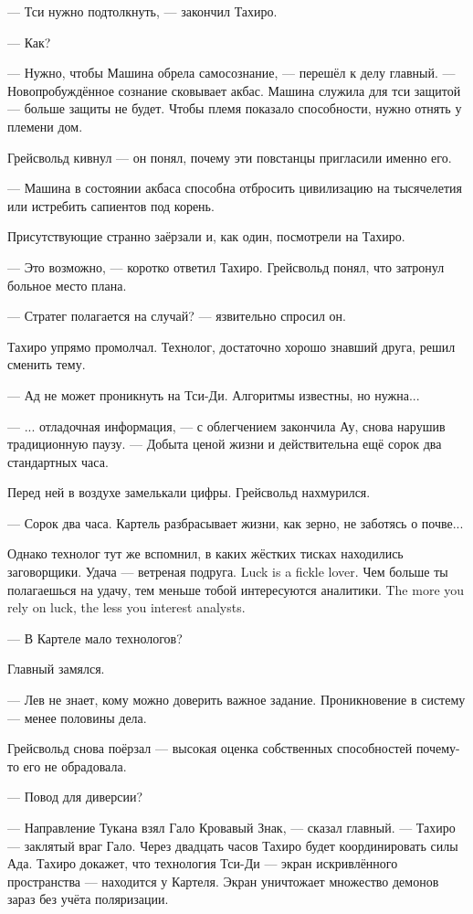 --- Тси нужно подтолкнуть, --- закончил Тахиро.

--- Как?

--- Нужно, чтобы Машина обрела самосознание, --- перешёл к делу главный.
--- Новопробуждённое сознание сковывает акбас.
Машина служила для тси защитой --- больше защиты не будет.
Чтобы племя показало способности, нужно отнять у племени дом.

Грейсвольд кивнул --- он понял, почему эти повстанцы пригласили именно его.

--- Машина в состоянии акбаса способна отбросить цивилизацию на тысячелетия или истребить сапиентов под корень.

Присутствующие странно заёрзали и, как один, посмотрели на Тахиро.

--- Это возможно, --- коротко ответил Тахиро.
Грейсвольд понял, что затронул больное место плана.

--- Стратег полагается на случай? --- язвительно спросил он.

Тахиро упрямо промолчал.
Технолог, достаточно хорошо знавший друга, решил сменить тему.

--- Ад не может проникнуть на Тси-Ди.
Алгоритмы известны, но нужна...

--- ... отладочная информация, --- с облегчением закончила Ау, снова нарушив традиционную паузу.
--- Добыта ценой жизни и действительна ещё сорок два стандартных часа.

Перед ней в воздухе замелькали цифры.
Грейсвольд нахмурился.

--- Сорок два часа.
Картель разбрасывает жизни, как зерно, не заботясь о почве...

Однако технолог тут же вспомнил, в каких жёстких тисках находились заговорщики.
{Удача --- ветреная подруга.}
{Luck is a fickle lover.}
{Чем больше ты полагаешься на удачу, тем меньше тобой интересуются аналитики.}
{The more you rely on luck, the less you interest analysts.}

--- В Картеле мало технологов?

Главный замялся.

--- Лев не знает, кому можно доверить важное задание.
Проникновение в систему --- менее половины дела.

Грейсвольд снова поёрзал --- высокая оценка собственных способностей почему-то его не обрадовала.

--- Повод для диверсии?

--- Направление Тукана взял Гало Кровавый Знак, --- сказал главный.
--- Тахиро --- заклятый враг Гало.
Через двадцать часов Тахиро будет координировать силы Ада.
Тахиро докажет, что технология Тси-Ди --- экран искривлённого пространства --- находится у Картеля.
Экран уничтожает множество демонов зараз без учёта поляризации.

